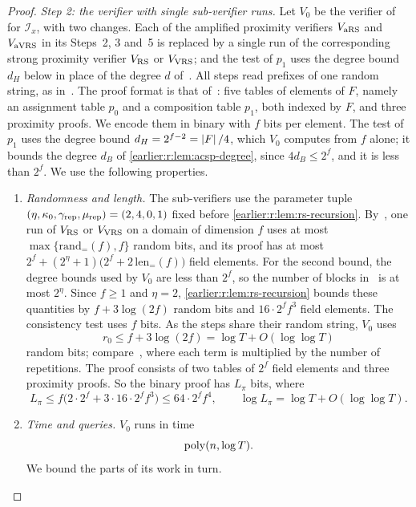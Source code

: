 \begin{proof}
\emph{Step 2: the verifier with single sub-verifier runs.} Let \(V_0\)
be the verifier of~\cite[Construction~8.5]{BCGT13} for
\(\mathcal I_x\), with two changes. Each of the amplified
proximity verifiers \(V_{\rm aRS}\) and \(V_{\rm aVRS}\) in its Steps~2,
3 and~5 is replaced by a single run of the corresponding strong
proximity verifier \(V_{\rm RS}\) or \(V_{\rm VRS}\); and the test of
\(p_1\) uses the degree bound \(d_H\) below in place of the degree \(d\)
of~\cite[Construction~8.5]{BCGT13}. All steps read
prefixes of one random string, as in~\cite[Algorithm~9]{BCGT13}. The
proof format is that of~\cite[Definition~8.4]{BCGT13}: five tables of
elements of \(F\), namely an assignment table \(p_0\) and a composition
table \(p_1\), both indexed by \(F\), and three proximity proofs. We
encode them in binary with \(f\) bits per element. The test of \(p_1\)
uses the degree bound \(d_H=2^{f-2}=\left|F\right|/4\), which \(V_0\) computes
from \(f\) alone; it bounds the degree \(d_B\) of \cref{earlier:r:lem:acsp-degree},
since \(4d_B\le2^f\), and it is less than \(2^f\). We use the following
properties.
\begin{enumerate}[label=(\alph*)]
\item \emph{Randomness and length.} The sub-verifiers use the
parameter tuple \((\eta,\kappa_0,\gamma_{\rm rep},\mu_{\rm rep})=(2,4,0,1)\)
fixed before \cref{earlier:r:lem:rs-recursion}. By~\cite[Lemmas~C.2--C.5]{BCGT13},
one run of \(V_{\rm RS}\) or \(V_{\rm VRS}\) on a domain of dimension
\(f\) uses at most \(\max\{\mathrm{rand}_=(f),f\}\) random bits, and its
proof has at most \(2^f+(2^\eta+1)\bigl(2^f+2\,\mathrm{len}_=(f)\bigr)\)
field elements. For the second bound, the degree bounds used by
\(V_0\) are less than \(2^f\), so the number of blocks
in~\cite[Lemma~C.3]{BCGT13} is at most \(2^\eta\). Since \(f\ge1\) and
\(\eta=2\), \cref{earlier:r:lem:rs-recursion} bounds these quantities by
\(f+3\log(2f)\) random bits and \(16\cdot2^ff^3\) field elements. The
consistency test uses \(f\) bits. As the steps share their random
string, \(V_0\) uses
\[
 r_0\le f+3\log(2f)=\log T+O(\log\log T)
\]
random bits; compare~\cite[Lemma~C.8]{BCGT13}, where each term is
multiplied by the number of repetitions. The proof consists of two
tables of \(2^f\) field elements and three proximity proofs. So the
binary proof has \(L_\pi\) bits, where
\[
 L_\pi\le f\bigl(2\cdot2^f+3\cdot16\cdot2^ff^3\bigr)\le64\cdot2^ff^4,
 \qquad \log L_\pi=\log T+O(\log\log T).
\]
\item \emph{Time and queries.} \(V_0\) runs in time
\[
 \operatorname{poly}(n,\log T).
\]
We bound the parts of its work in turn.

\end{enumerate}
\end{proof}
